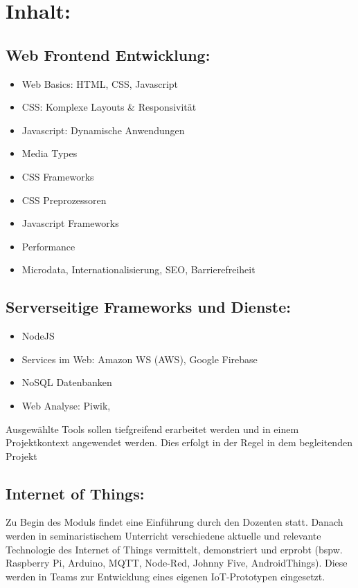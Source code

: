 \section*{Inhalt:}\label{inhalt-30}

\subsection*{Web Frontend
Entwicklung:}\label{web-frontend-entwicklung-1}

\begin{itemize}
\item
  Web Basics: HTML, CSS, Javascript
\item
  CSS: Komplexe Layouts \& Responsivität
\item
  Javascript: Dynamische Anwendungen
\item
  Media Types
\item
  CSS Frameworks
\item
  CSS Preprozessoren
\item
  Javascript Frameworks
\item
  Performance
\item
  Microdata, Internationalisierung, SEO, Barrierefreiheit
\end{itemize}

\subsection*{Serverseitige Frameworks und
Dienste:}\label{serverseitige-frameworks-und-dienste-1}

\begin{itemize}
\item
  NodeJS
\item
  Services im Web: Amazon WS (AWS), Google Firebase
\item
  NoSQL Datenbanken
\item
  Web Analyse: Piwik,
\end{itemize}

Ausgewählte Tools sollen tiefgreifend erarbeitet werden und in einem
Projektkontext angewendet werden. Dies erfolgt in der Regel in dem
begleitenden Projekt

\subsection*{Internet of Things:}\label{internet-of-things-1}

Zu Begin des Moduls findet eine Einführung durch den Dozenten statt.
Danach werden in seminaristischem Unterricht verschiedene aktuelle und
relevante Technologie des Internet of Things vermittelt, demonstriert
und erprobt (bspw. Raspberry Pi, Arduino, MQTT, Node-Red, Johnny Five,
AndroidThings). Diese werden in Teams zur Entwicklung eines eigenen
IoT-Prototypen eingesetzt.

